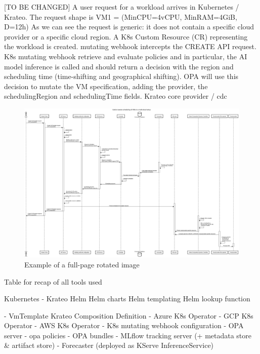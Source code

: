 [TO BE CHANGED]
A user request for a workload arrives in Kubernetes / Krateo. 
The request shape is VM1 = (MinCPU=4vCPU, MinRAM=4GiB, D=12h)
As we can see the request is generic: it does not contain a specific cloud provider or a specific cloud region.
A K8s Custom Resource (CR) representing the workload is created.
mutating webhook intercepts the CREATE API request.
K8s mutating webhook retrieve and evaluate policies and in particular, the AI model inference is called and should return a decision with the region and scheduling time (time-shifting and geographical shifting).
OPA will use this decision to mutate the VM specification, adding the provider, the schedulingRegion and schedulingTime fields.
Krateo core provider / cdc


\begin{figure}
  \centering
  \includegraphics[width=\textheight]{images/sequence_diagram.png}
  \caption{Example of a full-page rotated image}
  \label{fig:rotated_image}
\end{figure}


\newpage







Table for recap of all tools used

Kubernetes
- Krateo
Helm
    Helm charts
    Helm templating
    Helm lookup function

- VmTemplate Krateo Composition Definition
- Azure K8s Operator
- GCP K8s Operator
- AWS K8s Operator
- K8s mutating webhook configuration
- OPA server
- opa policies
- OPA bundles
- MLflow tracking server (+ metadata store & artifact store)
- Forecaster (deployed as KServe InferenceService)


\newpage
